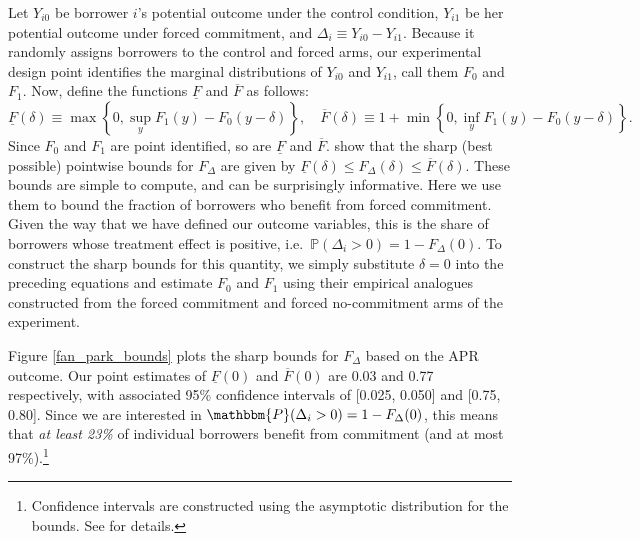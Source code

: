 \documentclass[11pt, a4paper]{article}
\begin{document}
Let $Y_{i0}$ be borrower $i$'s potential outcome under the control condition, $Y_{i1}$ be her potential outcome under forced commitment, and $\Delta_i \equiv Y_{i0} - Y_{i1}$.
Because it randomly assigns borrowers to the control and forced arms, our experimental design point identifies the marginal distributions of $Y_{i0}$ and $Y_{i1}$, call them $F_0$ and $F_1$.
Now, define the functions $\underline{F}$ and $\overline{F}$ as follows:
\[
\underline{F}(\delta) \equiv \max \left\{0, \sup_y F_1(y) - F_0(y - \delta)  \right\}, \quad
\overline{F}(\delta) \equiv 1 + \min \left\{0, \inf_y F_1(y) - F_0(y-\delta) \right\}.
\]
Since $F_0$ and $F_1$ are point identified, so are $\underline{F}$ and $\overline{F}$.
\cite{fan2010sharp} show that the sharp (best possible) pointwise bounds for $F_\Delta$ are given by $\underline{F}(\delta) \leq F_\Delta(\delta) \leq \overline{F}(\delta)$.
These bounds are simple to compute, and can be surprisingly informative. 
Here we use them to bound the fraction of borrowers who benefit from forced commitment. 
Given the way that we have defined our outcome variables, this is the share of borrowers whose treatment effect is positive, i.e.\ $\mathbb{P}(\Delta_i > 0) = 1 - F_\Delta(0)$. 
To construct the sharp bounds for this quantity, we simply substitute $\delta = 0$ into the preceding equations and estimate $F_0$ and $F_1$ using their empirical analogues constructed from the forced commitment and forced no-commitment arms of the experiment.

Figure \ref{fan_park_bounds} plots the sharp bounds for $F_{\Delta}$ based on the APR outcome. Our point estimates of $\underline{F}(0)$ and $\overline{F}(0)$  are 0.03 and 0.77 respectively, with associated 95\% confidence intervals of [0.025, 0.050] and [0.75, 0.80]. Since we are interested in $\mathbbm{P}(\Delta_i >0) = 1 - F_\Delta(0)$, this means that \textit{at least 23\%} of individual borrowers benefit from commitment (and at most 97\%).\footnote{Confidence intervals are constructed using the asymptotic distribution for the bounds. See \cite{fan2010sharp} for details.}
\end{document}
